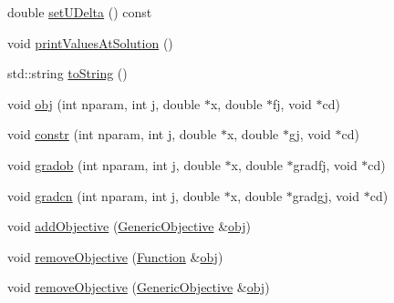 \begin{DoxyCompactItemize}
double \hyperlink{classocra_1_1FSQPSolver_ac7b6382beb8d6426376322257e2c8393}{set\+U\+Delta} () const
\item 
void \hyperlink{classocra_1_1FSQPSolver_ad41514dc166b19fca4812b5521777f0a}{print\+Values\+At\+Solution} ()
\item 
std\+::string \hyperlink{classocra_1_1FSQPSolver_a3edc67c5c989d020ac8a77bf08946d14}{to\+String} ()
\item 
void \hyperlink{classocra_1_1FSQPSolver_a1275a02361629480cc18d44ce46d915c}{obj} (int nparam, int j, double $\ast$x, double $\ast$fj, void $\ast$cd)
\item 
void \hyperlink{classocra_1_1FSQPSolver_ae989c0c32f87ea5e4e5a85e11683fcff}{constr} (int nparam, int j, double $\ast$x, double $\ast$gj, void $\ast$cd)
\item 
void \hyperlink{classocra_1_1FSQPSolver_ac88cddc691c4bf9862f9d6f30599a098}{gradob} (int nparam, int j, double $\ast$x, double $\ast$gradfj, void $\ast$cd)
\item 
void \hyperlink{classocra_1_1FSQPSolver_aea97ea5c3c2480976ad27c190b60077d}{gradcn} (int nparam, int j, double $\ast$x, double $\ast$gradgj, void $\ast$cd)
\end{DoxyCompactItemize}
{\bf }\par
\begin{DoxyCompactItemize}
\item 
void \hyperlink{classocra_1_1FSQPSolver_a22838ed156e3b4742e2a72ff128b8a4b}{add\+Objective} (\hyperlink{namespaceocra_a37a91885f4fa5c523d22cb15d5673062}{Generic\+Objective} \&\hyperlink{classocra_1_1FSQPSolver_a1275a02361629480cc18d44ce46d915c}{obj})
\item 
void \hyperlink{classocra_1_1FSQPSolver_a4c49fc6031becd57ed9710ecb7f4d3f8}{remove\+Objective} (\hyperlink{classocra_1_1Function}{Function} \&\hyperlink{classocra_1_1FSQPSolver_a1275a02361629480cc18d44ce46d915c}{obj})
\item 
void \hyperlink{classocra_1_1FSQPSolver_aeb5031b31d2b3f9a303f234aa8418754}{remove\+Objective} (\hyperlink{namespaceocra_a37a91885f4fa5c523d22cb15d5673062}{Generic\+Objective} \&\hyperlink{classocra_1_1FSQPSolver_a1275a02361629480cc18d44ce46d915c}{obj})
\end{DoxyCompactItemize}

